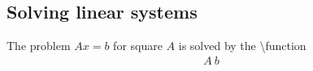 \documentclass{report}
\begin{document}
     \bigbreak \noindent 
     \subsection{Solving linear systems}
     \bigbreak \noindent 
     The problem $Ax = b$ for square $A$ is solved by the \textbackslash function
     \begin{align*}
         A\ b
     \end{align*}






































    
\end{document}
